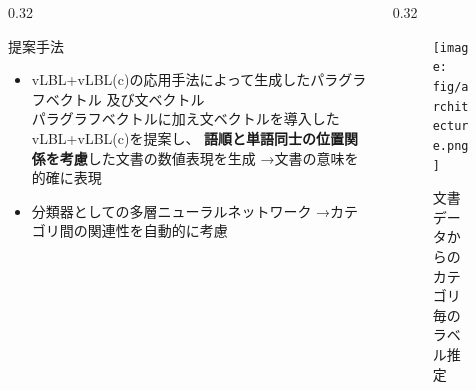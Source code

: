 \documentclass[10pt,unicode]{beamer}
\newcommand{\columnsize}{0.32}
\newcommand{\arrow}{{\color{ttiblue} →}\hspace{1ex}}
\newcommand{\notable}[1]{\textbf{\color{orange} #1}}
\newcommand{\keyword}[1]{\textbf{\color{red} #1}}
\begin{document}
\begin{frame}{}
\begin{columns}[t]
\begin{column}{\columnsize\textwidth}

  \begin{block}{提案手法}
    \begin{itemize}
      \item vLBL+vLBL(c)の応用手法によって生成したパラグラフベクトル
        及び文ベクトル \\
        パラグラフベクトルに加え文ベクトルを導入したvLBL+vLBL(c)を提案し、
        \notable{語順と単語同士の位置関係を考慮}した文書の数値表現を生成
        \arrow 文書の意味を的確に表現
      \item 分類器としての多層ニューラルネットワーク
        \arrow カテゴリ間の関連性を自動的に考慮
    \end{itemize}
  \end{block}
\end{column} %

\begin{column}{\columnsize\textwidth} %
    \begin{figure}
      \texttt{[image: fig/architecture.png]}
      \caption{文書データからのカテゴリ毎のラベル推定}
    \end{figure}


\end{column}
\end{columns}
\end{frame}
\end{document}
